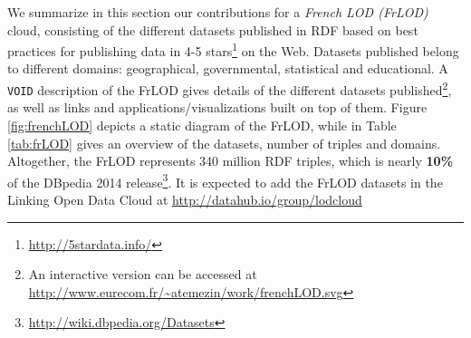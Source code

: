 We summarize in this section our contributions for a \textit{French LOD (FrLOD)} cloud, consisting of the different datasets published in RDF based on best practices for publishing data in 4-5 stars\footnote{\url{http://5stardata.info/}} on the Web. Datasets published belong to different domains: geographical, governmental, statistical and educational. A \texttt{VOID} \cite{alexander09} description of the FrLOD gives details of the different datasets published\footnote{An interactive version can be accessed at \url{http://www.eurecom.fr/~atemezin/work/frenchLOD.svg}}, as well as links and applications/visualizations built on top of them. Figure  \ref{fig:frenchLOD} depicts a static diagram of the FrLOD, while in Table \ref{tab:frLOD} gives an overview of the datasets, number of triples and domains. Altogether, the FrLOD represents 340 million RDF triples, which is nearly \textbf{10\%} of the DBpedia 2014 release\footnote{\url{http://wiki.dbpedia.org/Datasets}}. It is expected to add the FrLOD datasets in the Linking Open Data Cloud at \url{http://datahub.io/group/lodcloud}

\begin{figure}[h!tb]
\end{figure}

